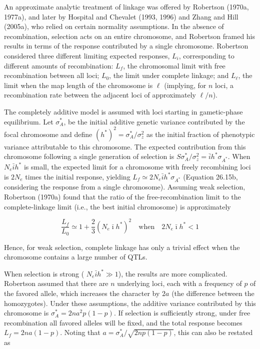\documentclass{article}
\begin{document}
An approximate analytic treatment of linkage was offered by Robertson (1970a, 1977a), and later by Hospital and Chevalet (1993, 1996) and Zhang and Hill (2005a), who relied on certain normality assumptions. In the absence of recombination, selection acts on an entire chromosome, and Robertson framed his results in terms of the response contributed by a single chromosome. Robertson considered three different limiting expected responses,  $ L_{i} $, corresponding to different amounts of recombination:  $ L_{f} $, the chromosomal limit with free recombination between all loci;  $ L_{0} $, the limit under complete linkage; and  $ L_{\ell} $, the limit when the map length of the chromosome is  $ \ell $ (implying, for  $ n $ loci, a recombination rate between the adjacent loci of approximately  $ \ell/n $).

The completely additive model is assumed with loci starting in gametic-phase equilibrium. Let  $ \sigma_A^* $, be the initial additive genetic variance contributed by the focal chromosome and define  $ (h^*)^2 = \sigma_A^* / \sigma_z^2 $ as the initial fraction of phenotypic variance attributable to this chromosome. The expected contribution from this chromosome following a single generation of selection is  $ S\sigma_A^* / \sigma_z^2 = \bar{i}h^* \sigma_{A^*} $. When  $ N_e \bar{i}h^* $ is small, the expected limit for a chromosome with freely recombining loci is  $ 2N_e $ times the initial response, yielding  $ L_f \simeq 2N_e \bar{i}h^* \sigma_{A^*} $ (Equation 26.15b, considering the response from a single chromosome). Assuming weak selection, Robertson (1970a) found that the ratio of the free-recombination limit to the complete-linkage limit (i.e., the best initial chromosome) is approximately

\begin{equation}
\frac{L_{f}}{L_{0}}\simeq1+\frac{2}{3}(N_{e}\bar{\imath}h^{*})^{2}\quad\mathrm{w h e n}\quad2N_{e}\bar{\imath}h^{*}<1
\tag{26.18}
\label{eq:26_18}
\end{equation}

Hence, for weak selection, complete linkage has only a trivial effect when the chromosome contains a large number of QTLs.

When selection is strong ( $ N_e \bar{i} h^* \gg 1 $), the results are more complicated. Robertson assumed that there are  $ n $ underlying loci, each with a frequency of  $ p $ of the favored allele, which increases the character by  $ 2a $ (the difference between the homozygotes). Under these assumptions, the additive variance contributed by this chromosome is  $ \sigma_A^* = 2na^2p(1 - p) $. If selection is sufficiently strong, under free recombination all favored alleles will be fixed, and the total response becomes  $ L_f = 2na(1 - p) $. Noting that  $ a = \sigma_A^* / \sqrt{2np(1 - p)} $, this can also be restated as
\end{document}
